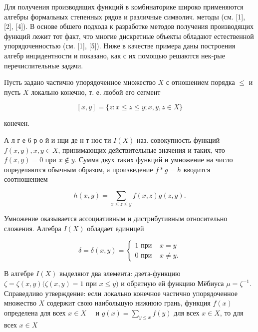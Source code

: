 \documentclass[10pt]{article}
\begin{document}
Для получения производящих функций в комбинаторике широко применяются алгебры формальных степенных рядов и различные символич. методы (см. [1], [2], [4]). В основе обшего подхода к разработке методов получения производящих функций лежит тот факт, что многие дискретные объекты обладают естественной упорядоченностью (см. [1], [5]). Ниже в качестве примера даны построения алгебр инцидентности и показано, как с их помощью решаются нек-рые перечислительные задачи.



Пусть задано частично упорядоченное множество $X$ с отношением порядка $\leqslant$ и пусть $X$ локально конечно, т. е. любой его сегмент



\[

[x, y]=\{z: x \leqslant z \leqslant y ; x, y, z \in X\}

\]



конечен.



А л г е 6 р о й и нци де н т нос ти $I(X)$ наз. совокупность функций $f(x, y), x, y \in X$, принимающих действительные значения и таких, что $f(x, y)=0$ при $x \notin y$. Сумма двух таких функций и умножение на число определяются обычным образом, а произведение $f * g=h$ вводится соотношением



\[

h(x, y)=\sum_{x \leqslant z \leqslant y} f(x, z) g(z, y) .

\]



Умножение оказывается ассоциативным и дистрибутивным относительно сложения. Алгебра $I(X)$ обладает единицей



\[

\delta=\delta(x, y)=\left\{\begin{array}{lll}

1 \text { при } & x=y \\

0 \text { при } & x \neq y .

\end{array}\right.

\]



В алгебре $I(X)$ выделяют два элемента: дзета-функцию $\zeta=\zeta(x, y)(\zeta(x, y)=1$ при $x \leqslant y)$ и обратную ей функцию Мёбиуса $\mu=\zeta^{-1}$. Справедливо утверждение: если локально конечное частично упорядоченное множество $X$ содержит свою наибольшую нижнюю грань, функция $f(x)$ определена для всех $x \in X \quad$ и $g(x)=\sum_{y \leqslant x} f(y)$ для всех $x \in X$, то для всех $x \in X$
\end{document}
